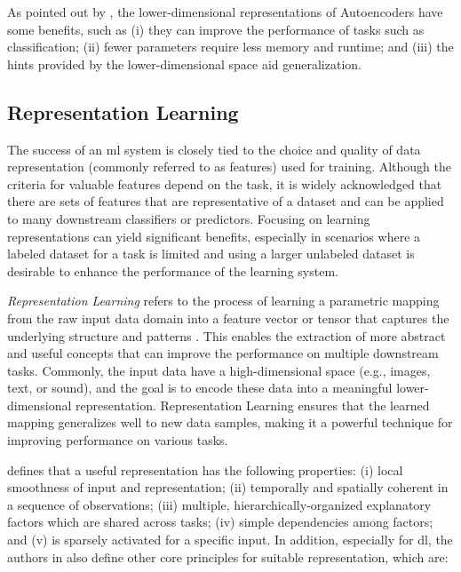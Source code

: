 As pointed out by \cite{lecun2015deep}, the lower-dimensional representations of Autoencoders have some benefits, such as (i) they can improve the performance of tasks such as classification; (ii) fewer parameters require less memory and runtime; and (iii) the hints provided by the lower-dimensional space aid generalization.

\subsection{Representation Learning}

The success of an \acs{ml} system is closely tied to the choice and quality of data representation (commonly referred to as features) used for training. Although the criteria for valuable features depend on the task, it is widely acknowledged that there are sets of features that are representative of a dataset and can be applied to many downstream classifiers or predictors. Focusing on learning representations can yield significant benefits, especially in scenarios where a labeled dataset for a task is limited and using a larger unlabeled dataset is desirable to enhance the performance of the learning system.

\textit{Representation Learning} refers to the process of learning a parametric mapping from the raw input data domain into a feature vector or tensor that captures the underlying structure and patterns \citep{le2020contrastive}. This enables the extraction of more abstract and useful concepts that can improve the performance on multiple downstream tasks. Commonly, the input data have a high-dimensional space (e.g., images, text, or sound), and the goal is to encode these data into a meaningful lower-dimensional representation. Representation Learning ensures that the learned mapping generalizes well to new data samples, making it a powerful technique for improving performance on various tasks.

\cite{bengio2013representation} defines that a useful representation has the following properties: (i) local smoothness of input and representation; (ii) temporally and spatially coherent in a sequence of observations; (iii) multiple, hierarchically-organized explanatory factors which are shared across tasks; (iv) simple dependencies among factors; and (v) is sparsely activated for a specific input. In addition, especially for \acl{dl}, the authors in \citep{le2020contrastive} also define other core principles for suitable representation, which are:

